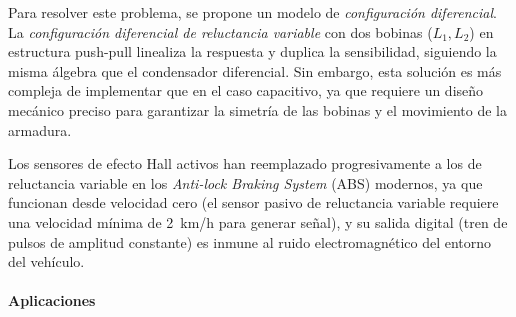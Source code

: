 Para resolver este problema, se propone un modelo de \emph{configuración diferencial}. La \emph{configuración diferencial de reluctancia variable} con dos bobinas ($L_1, L_2$) en estructura push-pull linealiza la respuesta y duplica la sensibilidad, siguiendo la misma álgebra que el condensador diferencial. Sin embargo, esta solución es más compleja de implementar que en el caso capacitivo, ya que requiere un diseño mecánico preciso para garantizar la simetría de las bobinas y el movimiento de la armadura.

\begin{marginfigure}
  \centering
  \shorthandoff{>}
  \caption[Respuesta $L(g)$ del sensor de reluctancia variable.]{Respuesta $L(g)$ del sensor de reluctancia variable. Solo en un entorno reducido del punto de operación la curva puede aproximarse por una recta.}\label{fig:curva_reluctancia}
\end{marginfigure}

Los sensores de efecto Hall activos han reemplazado progresivamente a los de reluctancia variable en los \emph{Anti-lock Braking System} (ABS) modernos, ya que funcionan desde velocidad cero (el sensor pasivo de reluctancia variable requiere una velocidad mínima de \qty{2}{km/h} para generar señal), y su salida digital (tren de pulsos de amplitud constante) es inmune al ruido electromagnético del entorno del vehículo.

\paragraph{Aplicaciones}

